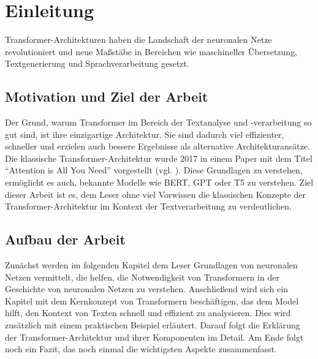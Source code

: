 \chapter{Einleitung}

Transformer-Architekturen haben die Landschaft der neuronalen Netze revolutioniert und neue Maßstäbe in Bereichen wie maschineller Übersetzung, Textgenerierung und Sprachverarbeitung gesetzt.  

\section{Motivation und Ziel der Arbeit}

Der Grund, warum Transformer im Bereich der Textanalyse und -verarbeitung so gut sind, ist ihre einzigartige Architektur.  
Sie sind dadurch viel effizienter, schneller und erzielen auch bessere Ergebnisse als alternative Architekturansätze.  
Die klassische Transformer-Architektur wurde 2017 in einem Paper mit dem Titel \enquote{Attention is All You Need} vorgestellt (vgl. \cite{attention}).  
Diese Grundlagen zu verstehen, ermöglicht es auch, bekannte Modelle wie BERT, GPT oder T5 zu verstehen.  
Ziel dieser Arbeit ist es, dem Leser ohne viel Vorwissen die klassischen Konzepte der Transformer-Architektur im Kontext der Textverarbeitung zu verdeutlichen.  

\section{Aufbau der Arbeit}

Zunächst werden im folgenden Kapitel dem Leser Grundlagen von neuronalen Netzen vermittelt, die helfen, die Notwendigkeit von Transformern in der Geschichte von neuronalen Netzen zu verstehen.  
Anschließend wird sich ein Kapitel mit dem Kernkonzept von Transformern beschäftigen, das dem Model hilft, den Kontext von Texten schnell und effizient zu analysieren.  
Dies wird zusätzlich mit einem praktischen Beispiel erläutert.  
Darauf folgt die Erklärung der Transformer-Architektur und ihrer Komponenten im Detail.  
Am Ende folgt noch ein Fazit, das noch einmal die wichtigsten Aspekte zusammenfasst.  

